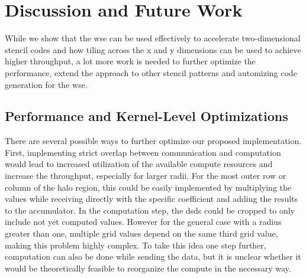 \chapter{Discussion and Future Work}
While we show that the \ac{wse} can be used effectively to accelerate two-dimensional stencil codes and how tiling across the x and y dimensions can be used to achieve higher throughput, a lot more work is needed to further optimize the performance, extend the approach to other stencil patterns and automizing code generation for the \ac{wse}.

\section{Performance and Kernel-Level Optimizations}
There are several possible ways to further optimize our proposed implementation.
First, implementing strict overlap between communication and computation would lead to increased utilization of the available compute resources and increase the throughput, especially for larger radii.
For the most outer row or column of the halo region, this could be easily implemented by multiplying the values while receiving directly with the specific coefficient and adding the results to the accumulator. In the computation step, the \acp{dsd} could be cropped to only include not yet computed values. However for the general case with a radius greater than one, multiple grid values depend on the same third grid value, making this problem highly complex. To take this idea one step further, computation can also be done while sending the data, but it is unclear whether it would be theoretically feasible to reorganize the compute in the necessary way.

